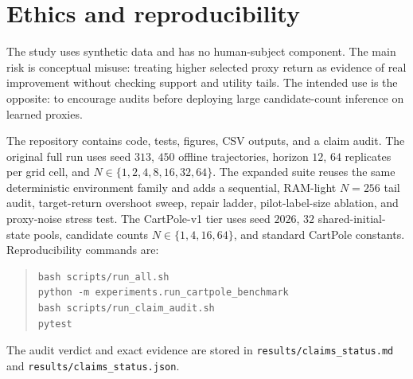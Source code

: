 \section{Ethics and reproducibility}
\label{sec:ethics}

The study uses synthetic data and has no human-subject component. The main risk is conceptual misuse: treating higher selected proxy return as evidence of real improvement without checking support and utility tails. The intended use is the opposite: to encourage audits before deploying large candidate-count inference on learned proxies.

The repository contains code, tests, figures, CSV outputs, and a claim audit. The original full run uses seed $313$, $450$ offline trajectories, horizon $12$, $64$ replicates per grid cell, and $N \in \{1,2,4,8,16,32,64\}$. The expanded suite reuses the same deterministic environment family and adds a sequential, RAM-light $N=256$ tail audit, target-return overshoot sweep, repair ladder, pilot-label-size ablation, and proxy-noise stress test. The CartPole-v1 tier uses seed $2026$, $32$ shared-initial-state pools, candidate counts $N\in\{1,4,16,64\}$, and standard CartPole constants. Reproducibility commands are:
\begin{quote}
\small
\begin{verbatim}
bash scripts/run_all.sh
python -m experiments.run_cartpole_benchmark
bash scripts/run_claim_audit.sh
pytest
\end{verbatim}
\end{quote}
The audit verdict and exact evidence are stored in \texttt{results/claims\_status.md} and \texttt{results/claims\_status.json}.
